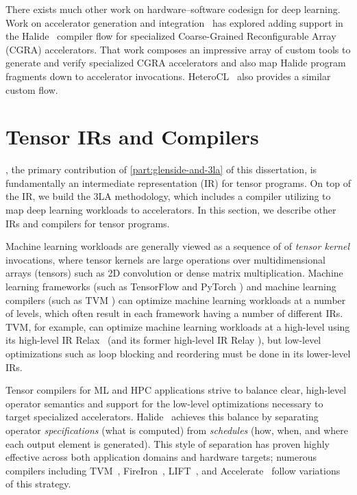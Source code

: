 There exists much other work on
  hardware--software codesign
  for deep learning.
Work on accelerator generation and integration~\cite{
    bahr2020creating, truong2020fault}
  has explored adding support in the Halide~\cite{ragan2013halide}
  compiler flow for specialized Coarse-Grained Reconfigurable Array (CGRA) accelerators.
That work composes an
  impressive array of custom tools to
  generate and verify specialized CGRA accelerators
  and also map Halide program fragments
  down to accelerator invocations.
HeteroCL~\cite{lai2019heterocl} also provides
  a similar custom flow.


\section{Tensor IRs and Compilers}

\g, the primary contribution
  of \cref{part:glenside-and-3la}
  of this dissertation,
  is fundamentally an
  intermediate representation (IR)
  for tensor programs.
On top of the \g IR,
  we build the 3LA methodology,
  which includes a compiler
  utilizing \g
  to map deep learning workloads
  to accelerators.
In this section, we describe
  other IRs and compilers
  for tensor programs.

Machine learning workloads
 are generally viewed
 as a sequence of 
 of \textit{tensor kernel} invocations,
 where tensor kernels
 are large operations
 over multidimensional arrays (tensors)
 such as 2D convolution
 or dense matrix multiplication.
Machine learning frameworks
 (such as TensorFlow \cite{tensorflow}
   and PyTorch \cite{pytorch})
 and machine learning compilers
 (such as TVM \cite{chen2018tvm})
 can optimize
 machine learning workloads
 at a number of levels,
 which often result
 in each framework
 having a number of different IRs.
TVM, for example,
 can optimize machine learning workloads
 at a high-level
 using its high-level IR
 Relax~\cite{lai2023relaxcomposableabstractionsendtoend}
 (and its former high-level
   IR Relay \cite{relay}),
 but
 low-level optimizations
 such as loop blocking and reordering
 must be done 
 in its lower-level IRs.


Tensor compilers for ML and HPC applications strive
  to balance clear, high-level operator semantics
  and support for the low-level optimizations
  necessary to target specialized accelerators.
Halide~\cite{halide}
  achieves this balance by separating
  operator \textit{specifications} (what is computed) from
  \textit{schedules} (how, when, and where
  each output element is generated).
This style of separation has proven
  highly effective across both
  application domains and hardware targets;
  numerous compilers including TVM~\cite{chen2018tvm},
  FireIron~\cite{hagedorn2020fireiron},
  LIFT~\cite{lift}, and Accelerate~\cite{accelerate}
  follow variations of this strategy.
  
